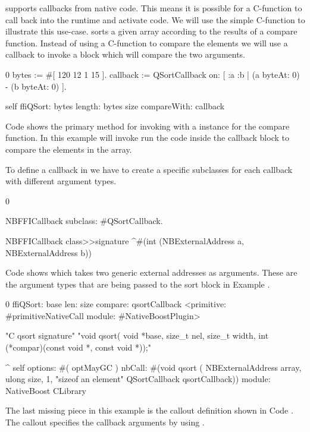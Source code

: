 \NB supports callbacks from native code.
This means it is possible for a C-function to call back into the \PH runtime and activate code.
We will use the simple  C-function to illustrate this use-case.
 sorts a given array according to the results of a compare function.
Instead of using a C-function to compare the elements we will use a callback to invoke a \PH block which will compare the two arguments.
%
\begin{stcode}[
	label={lst:calloutWithCallback},
	caption={Example of callout passing a callback for \ttt{qsort}}]{0}
bytes := #[ 120 12 1 15 ].
callback := QSortCallback on: [ :a :b |
				(a byteAt: 0) - (b byteAt: 0) ].

self ffiQSort: bytes
	 length: bytes size
	 compareWith: callback
\end{stcode}
%
Code  shows the primary \PH method for invoking  with a  instance for the compare function.
In this example  will invoke run the \PH code inside the callback block to compare the elements in the  array.

To define a callback in \NB we have to create a specific subclasses for each callback with different argument types.
%
\begin{stcode}[
	label={lst:callbackDefinition},
	caption={Example of callback definition}]{0}

NBFFICallback
    subclass: #QSortCallback.

NBFFICallback class>>signature
	^#(int (NBExternalAddress a, NBExternalAddress b))
\end{stcode}
%
Code  shows  which takes two generic external addresses as arguments.
These are the argument types that are being passed to the sort block in Example .
%
\begin{stcode}[
	label={lst:qsort},
	caption={Example of callout passing a callback}]{0}
ffiQSort: base len: size compare: qsortCallback
	<primitive: #primitiveNativeCall
	 module: #NativeBoostPlugin>

	"C qsort signature"
	"void qsort(
		void *base,
		size_t nel,
		size_t width,
		int (*compar)(const void *, const void *));"

	^ self
		options: #( optMayGC )
		nbCall: #(void qsort (
					NBExternalAddress array,
					ulong size,
					1, "sizeof an element"
					QSortCallback qsortCallback))
		module: NativeBoost CLibrary
\end{stcode}
%
The last missing piece in this example is the callout definition shown in Code .
The \NB callout specifies the callback arguments by using .

